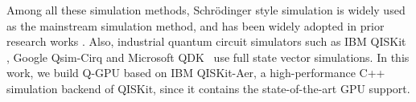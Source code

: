 Among all these simulation methods, Schr\"odinger style simulation is widely used as the mainstream simulation method, and has been widely adopted in prior research works \cite{10.1145/3126908.3126947, 10.1145/3295500.3356155,10.48550/arXiv.1910.09534,10.48550/arXiv.1710.05867,10.48550/arXiv.1601.07195,10.48550/arXiv.1804.04797,10.1109/HPCA51647.2021.00026,zotero-3528,10.1145/3310273.3323053,10.1016/j.cpc.2006.08.007}.
Also, industrial quantum circuit simulators such as IBM QISKit \cite{10.5281/zenodo.2562111}, Google Qsim-Cirq \cite{10.48550/arXiv.1601.07195,10.1145/3126908.3126947} and Microsoft QDK~\cite{msqdk} 
use full state vector simulations. 
In this work, we build Q-GPU based on IBM QISKit-Aer, a high-performance C++ simulation backend of QISKit, since it contains the state-of-the-art GPU support.

